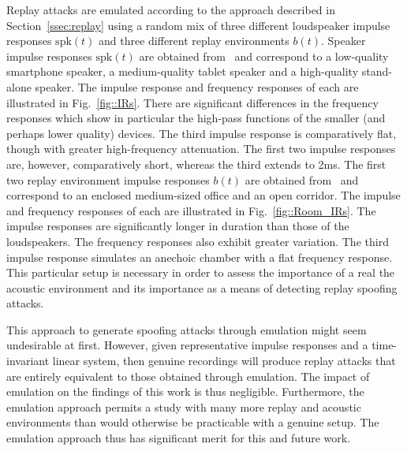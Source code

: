 Replay attacks are emulated according to the approach described in Section~\ref{ssec:replay} 
using a random mix of three different loudspeaker impulse responses $\mathrm{spk}(t)$ and three different replay environments $b(t)$.  
Speaker impulse responses $\mathrm{spk}(t)$ are obtained from~\cite{Brown2014} and correspond to a low-quality smartphone speaker, a medium-quality tablet speaker and a high-quality stand-alone speaker.  The impulse response and frequency responses of each are illustrated in Fig.~\ref{fig::IRs}.  There are significant differences in the frequency responses which show in particular the high-pass functions of the smaller (and perhaps lower quality) devices.  The third impulse response is comparatively flat, though with greater high-frequency attenuation.  The first two impulse responses are, however, comparatively short, whereas the third extends to 2ms.  The first two replay environment impulse responses $b(t)$ are obtained from~\cite{Jeub2009} and correspond to an enclosed medium-sized office and an open corridor. The impulse and frequency responses of each are illustrated in Fig.~\ref{fig::Room_IRs}.  The impulse responses are significantly longer in duration than those of the loudspeakers.  The frequency responses also exhibit greater variation.  The third impulse response simulates an anechoic chamber with a flat frequency response.  This particular setup is necessary in order to assess the importance of a real the acoustic environment and its importance as a means of detecting replay spoofing attacks.

This approach to generate spoofing attacks through emulation might seem undesirable at first.  However, given representative impulse responses and a time-invariant linear system, then genuine recordings will produce replay attacks that are entirely equivalent to those obtained through emulation.  The impact of emulation on the findings of this work is thus negligible.  Furthermore, the emulation approach permits a study with many more replay and acoustic environments than would otherwise be practicable with a genuine setup.  The emulation approach thus has significant merit for this and future work.


